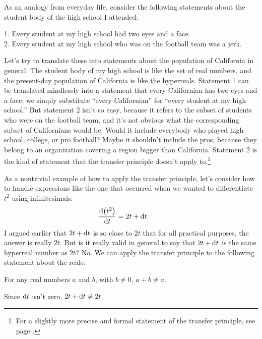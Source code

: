 As an analogy from everyday life, consider the following statements about the student body of the
high school I attended:

\begin{indentedblock}
1. Every student at my high school had two eyes and a face.\\
2. Every student at my high school who was on the football team was a jerk.
\end{indentedblock}

Let's try to translate these into statements about the population of California in general.
The student body of my high school is like the set of real numbers, and the present-day population
of California is like the hyperreals. Statement 1 can be translated mindlessly into a statement
that every Californian has two eyes and a face; we simply substitute ``every Californian'' for
``every student at my high school.'' But statement 2 isn't so easy, because it refers to the
subset of students who were on the football team, and it's not obvious what the corresponding
subset of Californians would be. Would it include everybody who played high school, college,
or pro football? Maybe it shouldn't include the pros, because they belong to an organization
covering a region bigger than California. Statement 2 is the kind of statement that the
transfer principle doesn't apply to.\footnote{For a slightly more precise and formal statement
of the transfer principle, see page \pageref{transfer}.}\label{backref-transfer}

\begin{eg}\label{eg:halo}
As a nontrivial example of how to apply the transfer principle, let's consider how to handle
expressions like the one that occurred when we wanted to differentiate $t^2$ using infinitesimals:
\begin{equation*}
  \frac{\operatorname{d\!} \left(t^2\right)}{\operatorname{d\!} t} = 2t+\operatorname{d\!} t  \qquad .
\end{equation*}
I argued earlier that $2t+\operatorname{d\!} t$ is so close to $2t$ that for all practical purposes, the
answer is really $2t$. But is it really valid in general to say that $2t+\operatorname{d\!} t$ is the
same hyperreal number as $2t$? No. We can apply the transfer principle to the
following statement about the reals:

\begin{indentedblock}
For any real numbers $a$ and $b$, with $b\ne 0$, $a+b\ne a$.
\end{indentedblock}

Since $\operatorname{d\!} t$ isn't zero, $2t+\operatorname{d\!} t\ne 2t$.
\end{eg}

